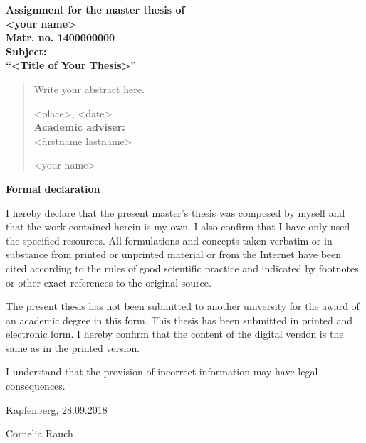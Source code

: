 \chapterend

\begin{titlepage}

\begin{center}\large\bf
Assignment for the master thesis of\\
<your name>\\
Matr. no. 1400000000
\\[2ex]
Subject:\\
``<Title of Your Thesis>''
\end{center}

\begin{abstract}
Write your abstract here.

<place>, <date>\\[1.5ex]
{\bf Academic adviser:}\\
<firstname lastname>

\flushright
\vspace{15mm}
<your name>
\end{abstract}

\end{titlepage}



\chapterend

\begin{titlepage}


\begin{center}\large\bf
Formal declaration
\end{center}


I hereby declare that the present master's thesis was composed by myself and that the work contained herein is my own. I also confirm that I have only used the specified resources. All formulations and concepts taken verbatim or in substance from printed or unprinted material or from the Internet have been cited according to the rules of good scientific practice and indicated by footnotes or other exact references to the original source. 

The present thesis has not been submitted to another university for the award of an academic degree in this form. This thesis has been submitted in printed and electronic form. I hereby confirm that the content of the digital version is the same as in the printed version.

I understand that the provision of incorrect information may have legal consequences.

\vspace{1,5cm}
Kapfenberg, 28.09.2018

\flushright
\vspace{15mm}
Cornelia Rauch

\end{titlepage}



